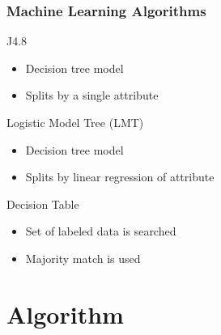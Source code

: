 \documentclass{beamer}
\begin{document}
\begin{frame}
	\frametitle{Machine Learning Algorithms}
		\begin{block}{J4.8 \autocite{j48_algorithm}}

			\begin{itemize}
				\item Decision tree model
				\item Splits by a single attribute
			\end{itemize}
		\end{block}

		\vspace{-10pt}
		\begin{block}{Logistic Model Tree (LMT) \autocite{lmt_algorithm}}

			\begin{itemize}
				\item Decision tree model
				\item Splits by linear regression of attribute
			\end{itemize}
		\end{block}

		\vspace{-10pt}
		\begin{block}{Decision Table \autocite{decisiontable_algorithm}}

			\begin{itemize}
				\item Set of labeled data is searched
				\item Majority match is used
			\end{itemize}
		\end{block}
\end{frame}
\section{Algorithm}
\end{document}
